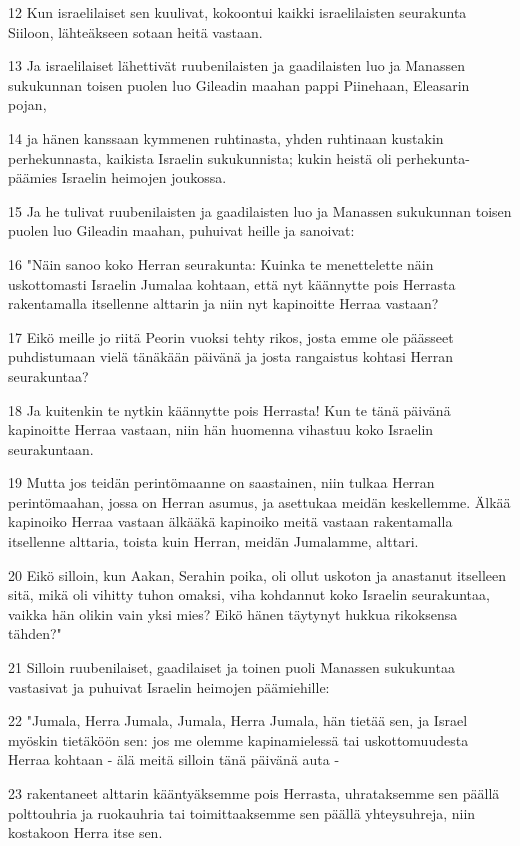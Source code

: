 \par 12 Kun israelilaiset sen kuulivat, kokoontui kaikki israelilaisten seurakunta Siiloon, lähteäkseen sotaan heitä vastaan.
\par 13 Ja israelilaiset lähettivät ruubenilaisten ja gaadilaisten luo ja Manassen sukukunnan toisen puolen luo Gileadin maahan pappi Piinehaan, Eleasarin pojan,
\par 14 ja hänen kanssaan kymmenen ruhtinasta, yhden ruhtinaan kustakin perhekunnasta, kaikista Israelin sukukunnista; kukin heistä oli perhekunta-päämies Israelin heimojen joukossa.
\par 15 Ja he tulivat ruubenilaisten ja gaadilaisten luo ja Manassen sukukunnan toisen puolen luo Gileadin maahan, puhuivat heille ja sanoivat:
\par 16 "Näin sanoo koko Herran seurakunta: Kuinka te menettelette näin uskottomasti Israelin Jumalaa kohtaan, että nyt käännytte pois Herrasta rakentamalla itsellenne alttarin ja niin nyt kapinoitte Herraa vastaan?
\par 17 Eikö meille jo riitä Peorin vuoksi tehty rikos, josta emme ole päässeet puhdistumaan vielä tänäkään päivänä ja josta rangaistus kohtasi Herran seurakuntaa?
\par 18 Ja kuitenkin te nytkin käännytte pois Herrasta! Kun te tänä päivänä kapinoitte Herraa vastaan, niin hän huomenna vihastuu koko Israelin seurakuntaan.
\par 19 Mutta jos teidän perintömaanne on saastainen, niin tulkaa Herran perintömaahan, jossa on Herran asumus, ja asettukaa meidän keskellemme. Älkää kapinoiko Herraa vastaan älkääkä kapinoiko meitä vastaan rakentamalla itsellenne alttaria, toista kuin Herran, meidän Jumalamme, alttari.
\par 20 Eikö silloin, kun Aakan, Serahin poika, oli ollut uskoton ja anastanut itselleen sitä, mikä oli vihitty tuhon omaksi, viha kohdannut koko Israelin seurakuntaa, vaikka hän olikin vain yksi mies? Eikö hänen täytynyt hukkua rikoksensa tähden?"
\par 21 Silloin ruubenilaiset, gaadilaiset ja toinen puoli Manassen sukukuntaa vastasivat ja puhuivat Israelin heimojen päämiehille:
\par 22 "Jumala, Herra Jumala, Jumala, Herra Jumala, hän tietää sen, ja Israel myöskin tietäköön sen: jos me olemme kapinamielessä tai uskottomuudesta Herraa kohtaan - älä meitä silloin tänä päivänä auta -
\par 23 rakentaneet alttarin kääntyäksemme pois Herrasta, uhrataksemme sen päällä polttouhria ja ruokauhria tai toimittaaksemme sen päällä yhteysuhreja, niin kostakoon Herra itse sen.
